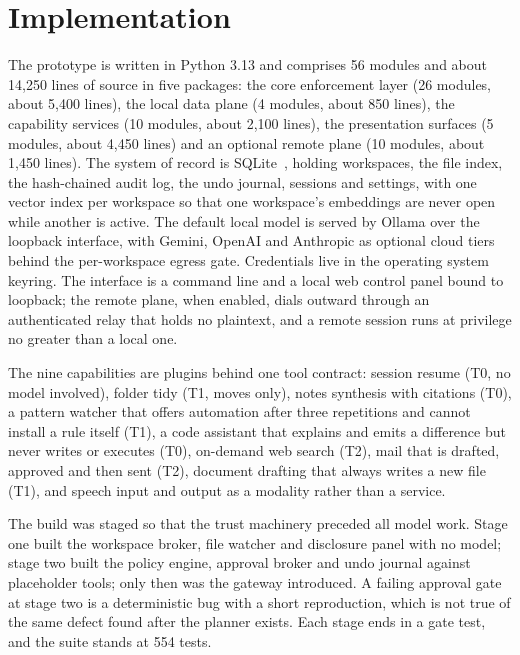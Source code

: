 \section{Implementation}
\label{sec:implementation}

The prototype is written in Python 3.13 and comprises 56 modules and about 14,250 lines of source in five packages: the core enforcement layer (26 modules, about 5,400 lines), the local data plane (4 modules, about 850 lines), the capability services (10 modules, about 2,100 lines), the presentation surfaces (5 modules, about 4,450 lines) and an optional remote plane (10 modules, about 1,450 lines). The system of record is SQLite~\cite{sqlite2024}, holding workspaces, the file index, the hash-chained audit log, the undo journal, sessions and settings, with one vector index per workspace so that one workspace's embeddings are never open while another is active. The default local model is served by Ollama over the loopback interface, with Gemini, OpenAI and Anthropic as optional cloud tiers behind the per-workspace egress gate. Credentials live in the operating system keyring. The interface is a command line and a local web control panel bound to loopback; the remote plane, when enabled, dials outward through an authenticated relay that holds no plaintext, and a remote session runs at privilege no greater than a local one.

The nine capabilities are plugins behind one tool contract: session resume (T0, no model involved), folder tidy (T1, moves only), notes synthesis with citations (T0), a pattern watcher that offers automation after three repetitions and cannot install a rule itself (T1), a code assistant that explains and emits a difference but never writes or executes (T0), on-demand web search (T2), mail that is drafted, approved and then sent (T2), document drafting that always writes a new file (T1), and speech input and output as a modality rather than a service.

The build was staged so that the trust machinery preceded all model work. Stage one built the workspace broker, file watcher and disclosure panel with no model; stage two built the policy engine, approval broker and undo journal against placeholder tools; only then was the gateway introduced. A failing approval gate at stage two is a deterministic bug with a short reproduction, which is not true of the same defect found after the planner exists. Each stage ends in a gate test, and the suite stands at 554 tests.
